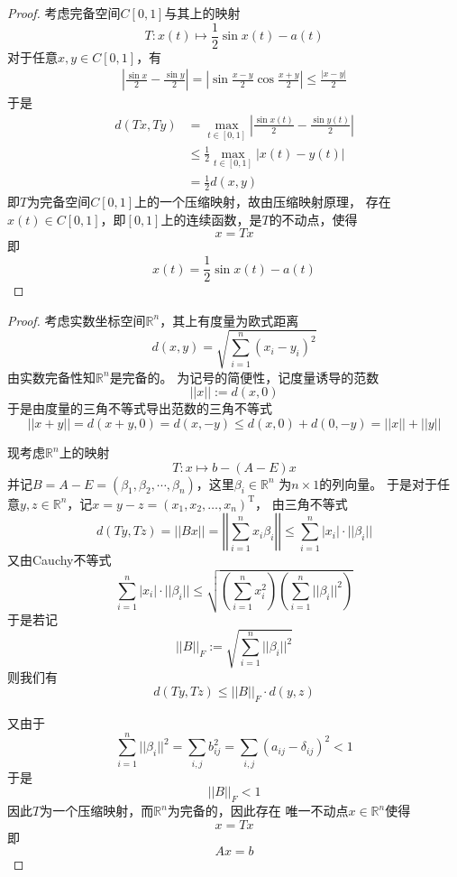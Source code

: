 \documentclass[cn]{homework}
\begin{document}
    \problem
    \begin{proof}
        考虑完备空间$C[0,1]$与其上的映射
        \[T:x(t)\mapsto\frac{1}{2}\sin x(t)-a(t)\]
        对于任意$x,y\in C[0,1]$，有
        \[\begin{aligned}
            \left|\frac{\sin x}{2}-\frac{\sin y}{2}\right|
            =\left|\sin\frac{x-y}{2}\cos\frac{x+y}{2}\right|
            \leq\frac{|x-y|}{2}
        \end{aligned}\]
        于是
        \[\begin{aligned}
        d(Tx,Ty)&=\max_{t\in[0,1]}\left|\frac{\sin x(t)}{2}-\frac{\sin y(t)}{2}\right|\\
        &\leq\frac{1}{2}\max_{t\in[0,1]}|x(t)-y(t)|\\
        &=\frac{1}{2}d(x,y)
        \end{aligned}\]
        即$T$为完备空间$C[0,1]$上的一个压缩映射，故由压缩映射原理，
        存在$x(t)\in C[0,1]$，即$[0,1]$上的连续函数，是$T$的不动点，使得
        \[x=Tx\]
        即
        \[x(t)=\frac{1}{2}\sin x(t)-a(t)\]
    \end{proof}

    \problem
    \begin{proof}
        考虑实数坐标空间$\mathbb R^n$，其上有度量为欧式距离
        \[d(x,y)=\sqrt{\sum_{i=1}^n(x_i-y_i)^2}\]
        由实数完备性知$\mathbb R^n$是完备的。
        为记号的简便性，记度量诱导的范数
        \[||x||:=d(x,0)\]
        于是由度量的三角不等式导出范数的三角不等式
        \[||x+y||=d(x+y,0)=d(x,-y)\leq d(x,0)+d(0,-y)=||x||+||y||\]

        现考虑$\mathbb R^n$上的映射
        \[T:x\mapsto b-(A-E)x\]
        并记$B=A-E=(\beta_1,\beta_2,\cdots,\beta_n)$，这里$\beta_i\in\mathbb R^n$
        为$n\times 1$的列向量。
        于是对于任意$y,z\in\mathbb R^n$，记$x=y-z=(x_1,x_2,\ldots,x_n)^\mathrm T$，
        由三角不等式
        \[d(Ty,Tz)=||Bx||=\left|\left|\sum_{i=1}^nx_i\beta_i\right|\right|
        \leq\sum_{i=1}^n|x_i|\cdot||\beta_i||\]
        又由Cauchy不等式
        \[\sum_{i=1}^n|x_i|\cdot||\beta_i||
        \leq\sqrt{\left(\sum_{i=1}^nx_i^2\right)\left(\sum_{i=1}^n||\beta_i||^2\right)}\]
        于是若记
        \[||B||_F:=\sqrt{\sum_{i=1}^n||\beta_i||^2}\]
        则我们有
        \[d(Ty,Tz)\leq ||B||_F\cdot d(y,z)\]

        又由于
        \[\sum_{i=1}^n||\beta_i||^2=\sum_{i,j}b_{ij}^2
        =\sum_{i,j}(a_{ij}-\delta_{ij})^2<1\]
        于是
        \[||B||_F<1\]
        因此$T$为一个压缩映射，而$\mathbb R^n$为完备的，因此存在
        唯一不动点$x\in\mathbb R^n$使得
        \[x=Tx\]
        即
        \[Ax=b\]
    \end{proof}
\end{document}
